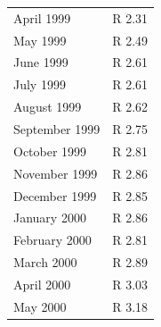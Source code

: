 \begin{description}[noitemsep]
\begin{description}[noitemsep]
\begin{table}
\begin{center}
\begin{xtabular}[t]{|l|l|}
        April 1999 &
        R 2.31%
     \tabularnewline{}
        May 1999 &
        R 2.49%
     \tabularnewline{}
        June 1999 &
        R 2.61%
     \tabularnewline{}
        July 1999 &
        R 2.61%
     \tabularnewline{}
        August 1999 &
        R 2.62%
     \tabularnewline{}
        September 1999 &
        R 2.75%
     \tabularnewline{}
        October 1999 &
        R 2.81%
     \tabularnewline{}
        November 1999 &
        R 2.86%
     \tabularnewline{}
        December 1999 &
        R 2.85%
     \tabularnewline{}
        January 2000 &
        R 2.86%
     \tabularnewline{}
        February 2000 &
        R 2.81%
     \tabularnewline{}
        March 2000 &
        R 2.89%
     \tabularnewline{}
        April 2000 &
        R 3.03%
     \tabularnewline{}
        May 2000 &
        R 3.18%
     \tabularnewline{}

\end{xtabular}
\end{center}
\end{table}
\end{description}
\end{description}
